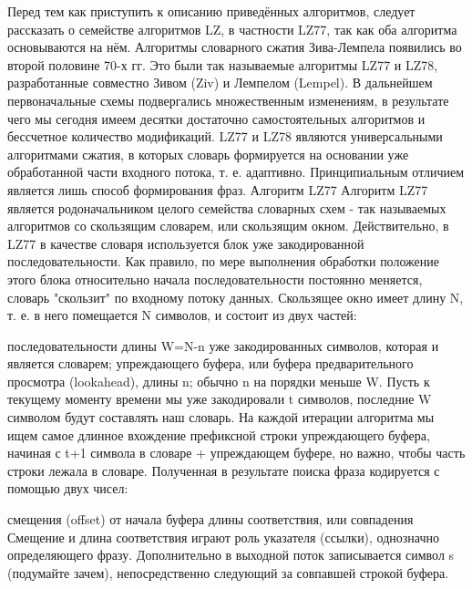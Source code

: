 \documentclass[12pt]{article}
\begin{document}
    Перед тем как приступить к описанию приведённых алгоритмов, следует рассказать о семействе алгоритмов LZ, в частности LZ77, так как оба алгоритма основываются на нём.
    Алгоритмы словарного сжатия Зива-Лемпела появились во второй половине 70-х гг. Это были так называемые алгоритмы LZ77 и LZ78, разработанные совместно Зивом (Ziv) и Лемпелом (Lempel). В дальнейшем первоначальные схемы подвергались множественным изменениям, в результате чего мы сегодня имеем десятки достаточно самостоятельных алгоритмов и бессчетное количество модификаций.
    LZ77 и LZ78 являются универсальными алгоритмами сжатия, в которых словарь формируется на основании уже обработанной части входного потока, т. е. адаптивно. Принципиальным отличием является лишь способ формирования фраз.
    Алгоритм LZ77
    Алгоритм LZ77 является родоначальником целого семейства словарных схем - так называемых алгоритмов со скользящим словарем, или скользящим окном. Действительно, в LZ77 в качестве словаря используется блок уже закодированной последовательности. Как правило, по мере выполнения обработки положение этого блока относительно начала последовательности постоянно меняется, словарь "скользит" по входному потоку данных. Скользящее окно имеет длину N, т. е. в него помещается N символов, и состоит из двух частей:

    последовательности длины W=N-n уже закодированных символов, которая и является словарем;
    упреждающего буфера, или буфера предварительного просмотра (lookahead), длины n; обычно n на порядки меньше W.
    Пусть к текущему моменту времени мы уже закодировали t символов, последние W символом будут составлять наш словарь. На каждой итерации алгоритма мы ищем самое длинное вхождение префиксной строки упреждающего буфера, начиная с t+1 символа в словаре + упреждающем буфере, но важно, чтобы часть строки лежала в словаре. Полученная в результате поиска фраза кодируется с помощью двух чисел:

    смещения (offset) от начала буфера
    длины соответствия, или совпадения
    Смещение и длина соответствия играют роль указателя (ссылки), однозначно определяющего фразу. Дополнительно в выходной поток записывается символ s (подумайте зачем), непосредственно следующий за совпавшей строкой буфера.
\end{document}
